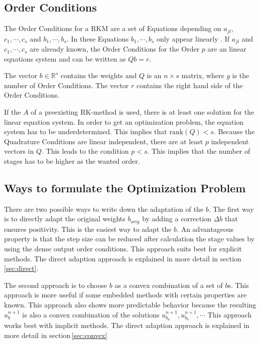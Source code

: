 \documentclass{article}
\begin{document}





\subsection{Order Conditions}\label{sec:OrderCond}

The Order Conditions for a RKM are a set of Equations depending on $a_{jl}$, $c_1,\cdots,c_s$ and $b_1,\cdots,b_s$. In these Equations $b_1,\cdots,b_s$ only appear linearly \cite{hairer_runge-kutta_1993}.
If $a_{jl}$ and $c_1,\cdots,c_s$ are already known, the Order Conditions for the Order $p$ are an linear equations system and can be written as $Q b = r$. 

The vector $b \in \mathbb{R}^s$ contains the weights and $Q$ is an $n \times s$ matrix, where $g$ is the number of Order Conditions. The vector $r$ contains the right hand side of the Order Conditions.

If the $A$ of a preexisting RK-method is used, there is at least one solution for the linear equation system.
In order to get an optimization problem, the equation system has to be underdetermined.
This implies that $\mathrm{rank}(Q) < s$. 
Because the Quadrature Conditions are linear independent, there are at least $p$ independent vectors in $Q$. This leads to the condition $p < s$.
This implies that the number of stages has to be higher as the wanted order.



\subsection{Ways to formulate the Optimization Problem}

There are two possible ways to write down the adaptation of the $b$. The first way is to directly adapt the original weights $b_{orig}$ by adding a correction $\Delta b$ that ensures positivity.
This is the easiest way to adapt the $b$. An advantageous property is that the step size can be reduced after calculation the stage values by using the dense output order conditions.  
This approach suits best for explicit methods.
The direct adaption approach is explained in more detail in section\,\ref{sec:direct}.

The second approach is to choose $b$ as a convex combination of a set of $b$s. This approach is more useful if some embedded methods with certain properties are known. 
This approach also shows more predictable behavior because the resulting $u^{n+1}_b$ is also a convex combination of the solutions $u^{n+1}_{b_a},u^{n+1}_{b_b},\cdots$ 
This approach works best with implicit methods.
The direct adaption approach is explained in more detail in section\,\ref{sec:convex}
\end{document}
